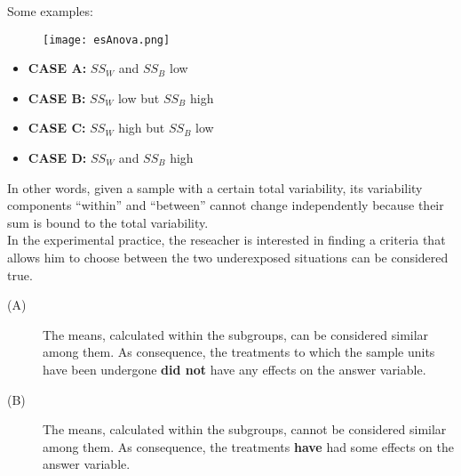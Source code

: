 \begin{frame} 
  \vspace{-.2cm}
  Some examples:
  \vspace{-.3cm}
  \begin{figure}
    \texttt{[image: esAnova.png]}
  \end{figure}
  \begin{footnotesize}
    \begin{itemize}
      \item \textbf{CASE A:} {\boldmath$ SS_W $} and {\boldmath$ SS_B $} low 
      \item \textbf{CASE B:} {\boldmath$ SS_W $} low but {\boldmath$ SS_B $} high
      \item \textbf{CASE C:} {\boldmath$ SS_W $} high but  {\boldmath$ SS_B $} low
      \item \textbf{CASE D:} {\boldmath$ SS_W $} and  {\boldmath$ SS_B $} high
    \end{itemize}
  \end{footnotesize}
\end{frame}

\begin{frame}
  \begin{small}
    \vspace*{.25cm}
    In other words, given a sample with a certain total variability, its variability components  ``within'' and ``between'' cannot change independently because their sum is bound to the total variability.\\
    \vspace*{.25cm}
    In the experimental practice, the reseacher is interested in finding a criteria that allows him to choose between the two underexposed situations can be considered true. 
    \vspace*{.25cm}
    \begin{description}
      \item[(A)]The means, calculated within the subgroups, can be considered similar among them. As consequence, the treatments to which the sample units have been undergone \textbf{did not} have any effects on the answer variable.
      \vspace*{.25cm}
      \item[(B)]The means, calculated within the subgroups, cannot be considered similar among them. As consequence, the treatments \textbf{have} had some effects on the answer variable.
    \end{description}
  \end{small}
\end{frame}

